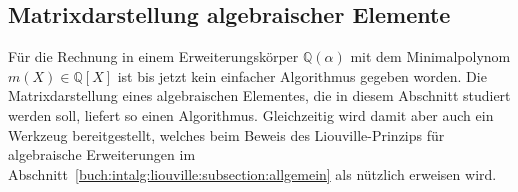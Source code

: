 %
%
%
\subsection{Matrixdarstellung algebraischer Elemente}
Für die Rechnung in einem Erweiterungskörper $\mathbb{Q}(\alpha)$
mit dem Minimalpolynom $m(X)\in \mathbb{Q}[X]$ ist bis jetzt kein
einfacher Algorithmus gegeben worden.
Die Matrixdarstellung eines algebraischen Elementes, die in diesem
Abschnitt studiert werden soll, liefert so einen Algorithmus.
Gleichzeitig wird damit aber auch ein Werkzeug bereitgestellt,
welches beim Beweis des Liouville-Prinzips für algebraische Erweiterungen
%
im Abschnitt~\ref{buch:intalg:liouville:subsection:allgemein}
als nützlich erweisen wird.

%
%
